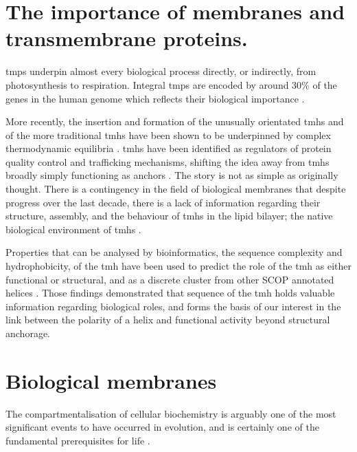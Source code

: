 \documentclass[12pt,PhD,twoside]{muthesis}
\begin{document}
\section{The importance of membranes and transmembrane proteins.}
\gls{tmp}s underpin almost every biological process directly, or indirectly, from photosynthesis to respiration. Integral \gls{tmp}s are encoded by around 30\% of the genes in the human genome which reflects their biological importance \cite{Almen2009}.

More recently, the insertion and formation of the unusually orientated \gls{tmh}s and of the more traditional \gls{tmh}s have been shown to be underpinned by complex thermodynamic equilibria \cite{Cymer2014}. \gls{tmh}s have been identified as regulators of protein quality control and trafficking mechanisms, shifting the idea away from \gls{tmh}s broadly simply functioning as anchors \cite{Hessa2011}. The story is not as simple as originally thought. There is a contingency in the field of biological membranes that despite progress over the last decade, there is a lack of information regarding their structure, assembly, and the behaviour of \gls{tmh}s in the lipid bilayer; the native biological environment of \gls{tmh}s \cite{Ladokhin2015, Cymer2014}.

Properties that can be analysed by bioinformatics, the sequence complexity and hydrophobicity, of the \gls{tmh} have been used to predict the role of the \gls{tmh} as either functional or structural, and as a discrete cluster from other SCOP annotated helices \cite{Wong2012}. Those findings demonstrated that sequence of the \gls{tmh} holds valuable information regarding biological roles, and forms the basis of our interest in the link between the polarity of a helix and functional activity beyond structural anchorage.

\section{Biological membranes}


The compartmentalisation of cellular biochemistry is arguably one of the most significant events to have occurred in evolution, and is certainly one of the fundamental prerequisites for life \cite{Koshland2002}.
\end{document}
